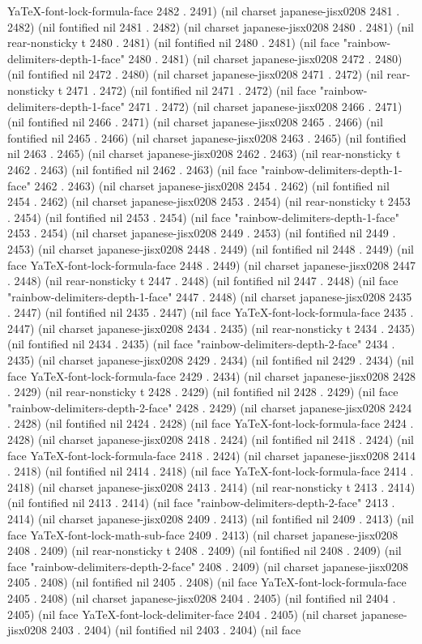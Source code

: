 YaTeX-font-lock-formula-face 2482 . 2491) (nil charset japanese-jisx0208 2481 . 2482) (nil fontified nil 2481 . 2482) (nil charset japanese-jisx0208 2480 . 2481) (nil rear-nonsticky t 2480 . 2481) (nil fontified nil 2480 . 2481) (nil face "rainbow-delimiters-depth-1-face" 2480 . 2481) (nil charset japanese-jisx0208 2472 . 2480) (nil fontified nil 2472 . 2480) (nil charset japanese-jisx0208 2471 . 2472) (nil rear-nonsticky t 2471 . 2472) (nil fontified nil 2471 . 2472) (nil face "rainbow-delimiters-depth-1-face" 2471 . 2472) (nil charset japanese-jisx0208 2466 . 2471) (nil fontified nil 2466 . 2471) (nil charset japanese-jisx0208 2465 . 2466) (nil fontified nil 2465 . 2466) (nil charset japanese-jisx0208 2463 . 2465) (nil fontified nil 2463 . 2465) (nil charset japanese-jisx0208 2462 . 2463) (nil rear-nonsticky t 2462 . 2463) (nil fontified nil 2462 . 2463) (nil face "rainbow-delimiters-depth-1-face" 2462 . 2463) (nil charset japanese-jisx0208 2454 . 2462) (nil fontified nil 2454 . 2462) (nil charset japanese-jisx0208 2453 . 2454) (nil rear-nonsticky t 2453 . 2454) (nil fontified nil 2453 . 2454) (nil face "rainbow-delimiters-depth-1-face" 2453 . 2454) (nil charset japanese-jisx0208 2449 . 2453) (nil fontified nil 2449 . 2453) (nil charset japanese-jisx0208 2448 . 2449) (nil fontified nil 2448 . 2449) (nil face YaTeX-font-lock-formula-face 2448 . 2449) (nil charset japanese-jisx0208 2447 . 2448) (nil rear-nonsticky t 2447 . 2448) (nil fontified nil 2447 . 2448) (nil face "rainbow-delimiters-depth-1-face" 2447 . 2448) (nil charset japanese-jisx0208 2435 . 2447) (nil fontified nil 2435 . 2447) (nil face YaTeX-font-lock-formula-face 2435 . 2447) (nil charset japanese-jisx0208 2434 . 2435) (nil rear-nonsticky t 2434 . 2435) (nil fontified nil 2434 . 2435) (nil face "rainbow-delimiters-depth-2-face" 2434 . 2435) (nil charset japanese-jisx0208 2429 . 2434) (nil fontified nil 2429 . 2434) (nil face YaTeX-font-lock-formula-face 2429 . 2434) (nil charset japanese-jisx0208 2428 . 2429) (nil rear-nonsticky t 2428 . 2429) (nil fontified nil 2428 . 2429) (nil face "rainbow-delimiters-depth-2-face" 2428 . 2429) (nil charset japanese-jisx0208 2424 . 2428) (nil fontified nil 2424 . 2428) (nil face YaTeX-font-lock-formula-face 2424 . 2428) (nil charset japanese-jisx0208 2418 . 2424) (nil fontified nil 2418 . 2424) (nil face YaTeX-font-lock-formula-face 2418 . 2424) (nil charset japanese-jisx0208 2414 . 2418) (nil fontified nil 2414 . 2418) (nil face YaTeX-font-lock-formula-face 2414 . 2418) (nil charset japanese-jisx0208 2413 . 2414) (nil rear-nonsticky t 2413 . 2414) (nil fontified nil 2413 . 2414) (nil face "rainbow-delimiters-depth-2-face" 2413 . 2414) (nil charset japanese-jisx0208 2409 . 2413) (nil fontified nil 2409 . 2413) (nil face YaTeX-font-lock-math-sub-face 2409 . 2413) (nil charset japanese-jisx0208 2408 . 2409) (nil rear-nonsticky t 2408 . 2409) (nil fontified nil 2408 . 2409) (nil face "rainbow-delimiters-depth-2-face" 2408 . 2409) (nil charset japanese-jisx0208 2405 . 2408) (nil fontified nil 2405 . 2408) (nil face YaTeX-font-lock-formula-face 2405 . 2408) (nil charset japanese-jisx0208 2404 . 2405) (nil fontified nil 2404 . 2405) (nil face YaTeX-font-lock-delimiter-face 2404 . 2405) (nil charset japanese-jisx0208 2403 . 2404) (nil fontified nil 2403 . 2404) (nil face 